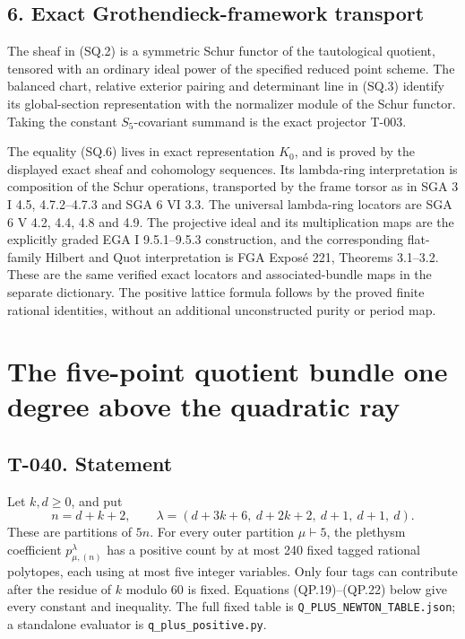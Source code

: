 \documentclass[
  10pt,
]{article}
\begin{document}
\subsection{6. Exact Grothendieck-framework
transport}\label{exact-grothendieck-framework-transport}

The sheaf in (SQ.2) is a symmetric Schur functor of the tautological
quotient, tensored with an ordinary ideal power of the specified reduced
point scheme. The balanced chart, relative exterior pairing and
determinant line in (SQ.3) identify its global-section representation
with the normalizer module of the Schur functor. Taking the constant
\(S_5\)-covariant summand is the exact projector T-003.

The equality (SQ.6) lives in exact representation \(K_0\), and is proved
by the displayed exact sheaf and cohomology sequences. Its lambda-ring
interpretation is composition of the Schur operations, transported by
the frame torsor as in SGA 3 I 4.5, 4.7.2--4.7.3 and SGA 6 VI 3.3. The
universal lambda-ring locators are SGA 6 V 4.2, 4.4, 4.8 and 4.9. The
projective ideal and its multiplication maps are the explicitly graded
EGA I 9.5.1--9.5.3 construction, and the corresponding flat-family
Hilbert and Quot interpretation is FGA Exposé 221, Theorems 3.1--3.2.
These are the same verified exact locators and associated-bundle maps in
the separate dictionary. The positive lattice formula follows by the
proved finite rational identities, without an additional unconstructed
purity or period map.

\section{The five-point quotient bundle one degree above the quadratic
ray}\label{the-five-point-quotient-bundle-one-degree-above-the-quadratic-ray}

\subsection{T-040. Statement}\label{t-040.-statement}

Let \(k,d\ge0\), and put \[
n=d+k+2,\qquad
\lambda=(d+3k+6,\ d+2k+2,\ d+1,\ d+1,\ d).
\tag{QP.1}
\] These are partitions of \(5n\). For every outer partition
\(\mu\vdash5\), the plethysm coefficient \(p_{\mu,(n)}^\lambda\) has a
positive count by at most 240 fixed tagged rational polytopes, each
using at most five integer variables. Only four tags can contribute
after the residue of \(k\) modulo 60 is fixed. Equations
(QP.19)--(QP.22) below give every constant and inequality. The full
fixed table is
\texttt{\small Q\_\allowbreak{}PLUS\_\allowbreak{}NEWTON\_\allowbreak{}TABLE.json};
a standalone evaluator is
\texttt{\small q\_\allowbreak{}plus\_\allowbreak{}positive.py}.
\end{document}
